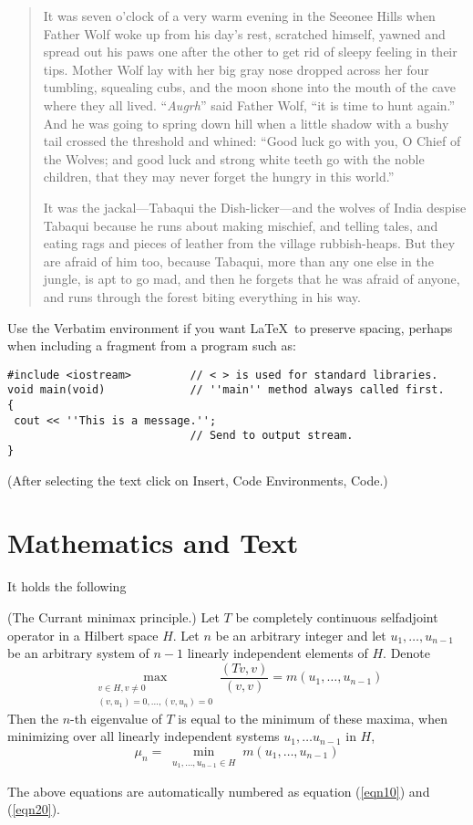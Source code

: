\begin{quotation}
It was seven o'clock of a very warm evening in the Seeonee Hills
when Father Wolf woke up from his day's rest, scratched himself,
yawned  and spread out his paws one after the other to get rid of
sleepy feeling in their tips. Mother Wolf lay with her big gray
nose dropped across her four tumbling, squealing cubs, and the
moon shone into the mouth of the cave where they all lived.
``\emph{Augrh}'' said Father Wolf, ``it is time to hunt again.''
And he was going to spring down hill when a little shadow with a
bushy tail crossed the threshold and whined: ``Good luck go with
you, O Chief of the Wolves; and good luck and strong white teeth
go with the noble children, that they may never forget the hungry
in this world.''

It was the jackal---Tabaqui the Dish-licker---and the wolves of
India despise Tabaqui because he runs about making mischief, and
telling tales, and eating rags and pieces of leather from the
village rubbish-heaps. But they are afraid of him too, because
Tabaqui, more than any one else in the jungle, is apt to go mad,
and then he forgets that he was afraid of anyone, and runs through
the forest biting everything in his way.
\end{quotation}

Use the Verbatim environment if you want \LaTeX\ to preserve
spacing, perhaps when including a fragment from a program such as:
\begin{verbatim}
#include <iostream>         // < > is used for standard libraries.
void main(void)             // ''main'' method always called first.
{
 cout << ''This is a message.'';
                            // Send to output stream.
}
\end{verbatim}
(After selecting the text click on Insert, Code Environments,
Code.)


\section{Mathematics and Text}

It holds \cite{KarelRektorys} the following
\begin{theorem}
(The Currant minimax principle.) Let $T$ be completely continuous
selfadjoint operator in a Hilbert space $H$. Let $n$ be an
arbitrary integer and let $u_1,\ldots,u_{n-1}$ be an arbitrary
system of $n-1$ linearly independent elements of $H$. Denote
\begin{equation}
\max_{\substack{v\in H, v\neq
0\\(v,u_1)=0,\ldots,(v,u_n)=0}}\frac{(Tv,v)}{(v,v)}=m(u_1,\ldots,
u_{n-1}) \label{eqn10}
\end{equation}
Then the $n$-th eigenvalue of $T$ is equal to the minimum of these
maxima, when minimizing over all linearly independent systems
$u_1,\ldots u_{n-1}$ in $H$,
\begin{equation}
\mu_n = \min_{\substack{u_1,\ldots, u_{n-1}\in H}} m(u_1,\ldots,
u_{n-1}) \label{eqn20}
\end{equation}
\end{theorem}
The above equations are automatically numbered as equation
(\ref{eqn10}) and (\ref{eqn20}).


